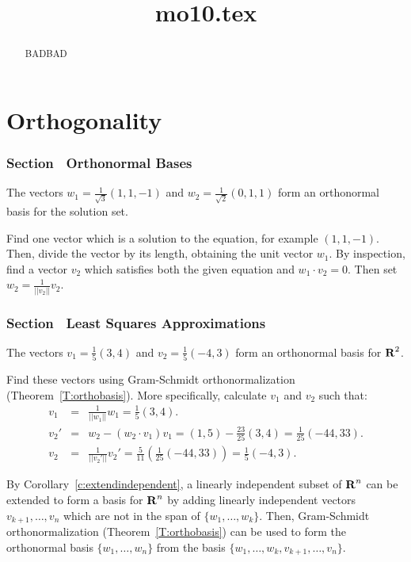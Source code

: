 \documentclass{ximera}
\title{mo10.tex}
\begin{document}
\begin{abstract}
BADBAD
\end{abstract}
\maketitle

\chapter{Orthogonality}

\subsection*{Section~\protect{\ref{S:orthonormal}} Orthonormal Bases}

\ans The vectors $w_1 = \frac{1}{\sqrt{3}}(1,1,-1)$ and
$w_2 = \frac{1}{\sqrt{2}}(0,1,1)$ form an orthonormal basis
for the solution set.

\soln Find one vector which is a solution to the equation, for
example $(1,1,-1)$.  Then, divide the vector by its length, obtaining
the unit vector $w_1$.  By inspection, find a vector $v_2$ which
satisfies both the given equation and $w_1 \cdot v_2 = 0$.  Then set
$w_2 = \frac{1}{||v_2||}v_2$.



\subsection*{Section~\protect{\ref{S:LSA}} Least Squares Approximations}

\ans The vectors $v_1 = \frac{1}{5}(3,4)$ and $v_2 = \frac{1}{5}(-4,3)$
form an orthonormal basis for $\mbox{$\bf{R}$}^2$.

\soln Find these vectors using Gram-Schmidt orthonormalization
(Theorem~\ref{T:orthobasis}).  More
specifically, calculate $v_1$ and $v_2$ such that:
\[
\begin{array}{rcl}
v_1 & = & \frac{1}{||w_1||}w_1 = \frac{1}{5}(3,4). \\
v_2' & = & w_2 - (w_2 \cdot v_1)v_1 = (1,5) - \frac{23}{25}(3,4)
= \frac{1}{25}(-44,33). \\
v_2 & = & \frac{1}{||v_2'||}v_2' = \frac{5}{11}
\left(\frac{1}{25}(-44,33)\right) = \frac{1}{5}(-4,3).
\end{array}
\]

By Corollary~\ref{c:extendindependent},
a linearly independent subset of $\mbox{$\bf{R}$}^n$ can be extended to form a
basis for $\mbox{$\bf{R}$}^n$ by adding linearly independent vectors
$v_{k+1},\ldots,v_n$ which are not in the span of
$\{w_1,\ldots,w_k\}$.  Then, Gram-Schmidt orthonormalization
(Theorem~\ref{T:orthobasis}) can be used
to form the orthonormal basis $\{w_1,\ldots,w_n\}$ from the basis
$\{w_1,\ldots,w_k,v_{k+1},\ldots,v_n\}$.
\end{document}
